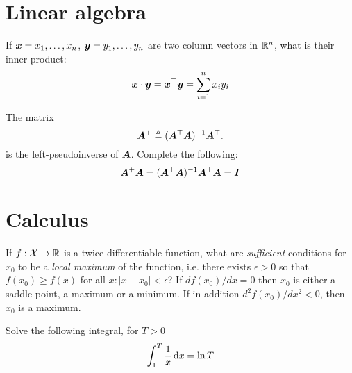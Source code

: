 \documentclass[a4paper]{article}
\def\solution {0}
\begin{document}
\section{Linear algebra}

\begin{exercise}
  If $\bx = x_1, \ldots, x_n$, $\by = y_1, \ldots, y_n$ are two column vectors in ${\mathbb{R}}^n$, what is their inner product:
  \[
  \bx \cdot \by = \bx^\top \by = 
  \ifdefined \solution
  \sum_{i=1}^n x_i y_i
  \fi
  \]
\end{exercise}

\begin{exercise}
  The matrix 
  \[
  \MA^+ \defn (\MA^\top \MA)^{-1} \MA^\top.
  \]
  is the left-pseudoinverse of $\MA$. Complete the following:
  \[
  \MA^+ \MA =
  \ifdefined \solution
  (\MA^\top \MA)^{-1} \MA^\top \MA
  = 
  \eye
  \fi
  \]
\end{exercise}


\section{Calculus}

\begin{exercise}
  If $f : {\mathcal{X}} \to {\mathbb{R}}$ is a twice-differentiable function, what are \emph{sufficient} conditions for $x_0$ to be a \emph{local maximum} of the function, i.e. there exists $\epsilon > 0$ so that $f(x_0) \geq f(x)$ for all $x : |x - x_0| < \epsilon$?
  \ifdefined\solution
  If $d f(x_0) /dx  = 0$ then
  $x_0$ is either a saddle point, a maximum or a minimum. If in addition $d^2 f(x_0) /dx^2 < 0$, then $x_0$ is a maximum.
  \fi
\end{exercise}

\begin{exercise}
  Solve the following integral, for $T > 0$
  \[
  \int_{1}^T \frac{1}{x} \dd x =
  \ifdefined\solution
  \ln T
  \else 
  \ldots
  \fi
  \]
\end{exercise}
\end{document}

